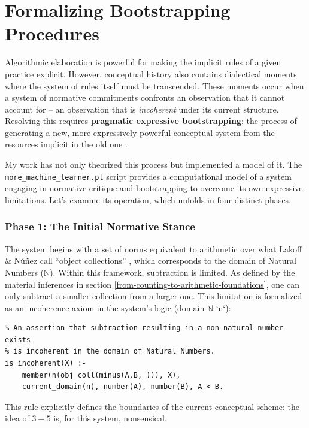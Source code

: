 \documentclass[12pt]{book}
\begin{document}
\section{Formalizing Bootstrapping Procedures}

Algorithmic elaboration is powerful for making the implicit rules of a given practice explicit. However, conceptual history also contains dialectical moments where the system of rules itself must be transcended. These moments occur when a system of normative commitments confronts an observation that it cannot account for -- an observation that is \textit{incoherent} under its current structure. Resolving this requires \textbf{pragmatic expressive bootstrapping}: the process of generating a new, more expressively powerful conceptual system from the resources implicit in the old one \parencite{Brandom2008}.

My work has not only theorized this process but implemented a model of it. The \texttt{more\_machine\_learner.pl} script provides a computational model of a system engaging in normative critique and bootstrapping to overcome its own expressive limitations. Let's examine its operation, which unfolds in four distinct phases.

\subsubsection{Phase 1: The Initial Normative Stance}

The system begins with a set of norms equivalent to arithmetic over what Lakoff \& Núñez call ``object collections'' \parencite{Lakoff2000}, which corresponds to the domain of Natural Numbers ($\mathbb{N}$). Within this framework, subtraction is limited. As defined by the material inferences in section \ref{from-counting-to-arithmetic-foundations}, one can only subtract a smaller collection from a larger one. This limitation is formalized as an incoherence axiom in the system's logic (domain $\mathbb{N}$ `n`):
\begin{verbatim}
% An assertion that subtraction resulting in a non-natural number exists
% is incoherent in the domain of Natural Numbers.
is_incoherent(X) :-
    member(n(obj_coll(minus(A,B,_))), X),
    current_domain(n), number(A), number(B), A < B.
\end{verbatim}
This rule explicitly defines the boundaries of the current conceptual scheme: the idea of $3 - 5$ is, for this system, nonsensical.
\end{document}
